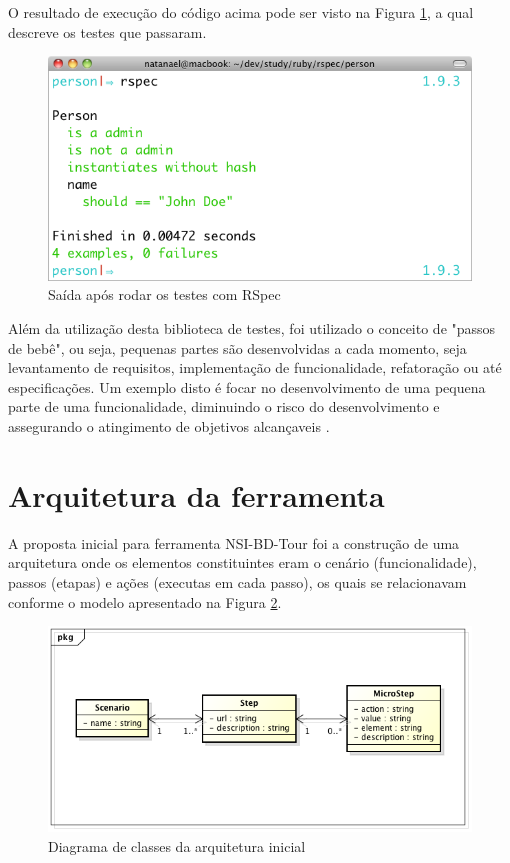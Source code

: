 O resultado de execução do código acima pode ser visto na Figura \ref{figura_31}, a qual descreve os testes que passaram.

\begin{figure}[ht]
    \centering
    \includegraphics[width=0.9 \textwidth]{figuras/figura_31}
    \caption{Saída após rodar os testes com RSpec}
    \label{figura_31}
\end{figure}

Além da utilização desta biblioteca de testes, foi utilizado o conceito de "passos de bebê", ou seja, pequenas partes são desenvolvidas a cada momento, seja levantamento de requisitos, implementação de funcionalidade, refatoração ou até especificações. Um exemplo disto é focar no desenvolvimento de uma pequena parte de uma funcionalidade, diminuindo o risco do desenvolvimento e assegurando o atingimento de objetivos alcançaveis \cite{RODRIGO}.















\section{Arquitetura da ferramenta}

A proposta inicial para ferramenta NSI-BD-Tour foi a construção de uma arquitetura onde os elementos constituintes eram o cenário (funcionalidade), passos (etapas) e ações (executas em cada passo), os quais se relacionavam conforme o modelo apresentado na Figura \ref{figura_32}.

\begin{figure}[ht]
    \centering
    \includegraphics[width=0.5 \textwidth]{figuras/figura_32}
    \caption{Diagrama de classes da arquitetura inicial}
    \label{figura_32}
\end{figure}

